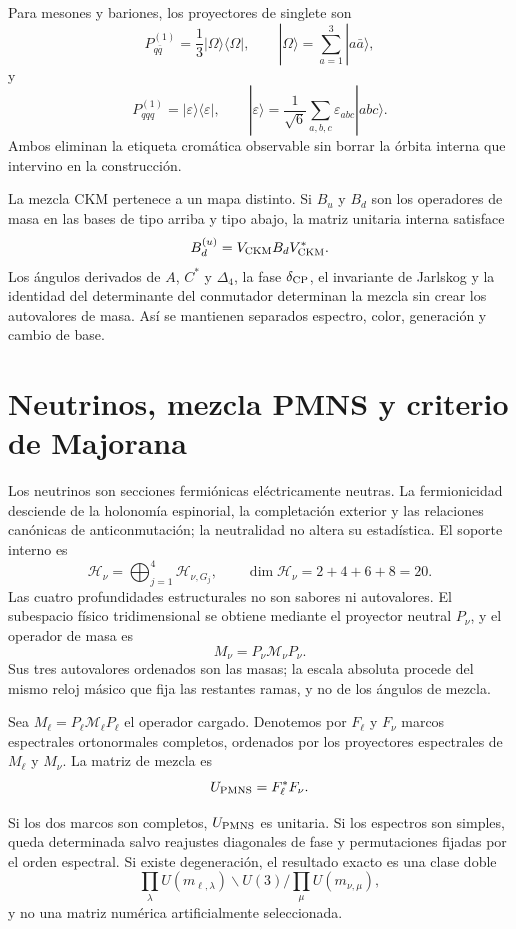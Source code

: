 Para mesones y bariones, los proyectores de singlete son
\[
 P_{q\bar q}^{(1)}
 =\frac1{3}|\Omega\rangle\langle\Omega|,
 \qquad
 |\Omega\rangle=\sum_{a=1}^{3}|a\bar a\rangle,
\]
y
\[
 P_{qqq}^{(1)}
 =|\varepsilon\rangle\langle\varepsilon|,
 \qquad
 |\varepsilon\rangle
 =\frac1{\sqrt6}\sum_{a,b,c}\varepsilon_{abc}|abc\rangle.
\]
Ambos eliminan la etiqueta cromática observable sin borrar la órbita interna
que intervino en la construcción.

La mezcla CKM pertenece a un mapa distinto. Si \(B_u\) y \(B_d\) son los
operadores de masa en las bases de tipo arriba y tipo abajo, la matriz unitaria
interna satisface
\[
 B_d^{(u)}=V_{\rm CKM} B_d V_{\rm CKM}^*.
\]
Los ángulos derivados de \(A\), \(C^*\) y \(\Delta_4\), la fase
\(\delta_{\rm CP}\), el invariante de Jarlskog y la identidad del determinante
del conmutador determinan la mezcla sin crear los autovalores de masa. Así se
mantienen separados espectro, color, generación y cambio de base.

\section{Neutrinos, mezcla PMNS y criterio de Majorana}

Los neutrinos son secciones fermiónicas eléctricamente neutras. La
fermionicidad desciende de la holonomía espinorial, la completación exterior y
las relaciones canónicas de anticonmutación; la neutralidad no altera su
estadística. El soporte interno es
\[
 \mathcal H_\nu=
 \bigoplus_{j=1}^{4}\mathcal H_{\nu,G_j},
 \qquad
 \dim\mathcal H_\nu=2+4+6+8=20.
\]
Las cuatro profundidades estructurales no son sabores ni autovalores. El
subespacio físico tridimensional se obtiene mediante el proyector neutral
\(P_\nu\), y el operador de masa es
\[
 M_\nu=P_\nu\mathcal M_\nu P_\nu.
\]
Sus tres autovalores ordenados son las masas; la escala absoluta procede del
mismo reloj másico que fija las restantes ramas, y no de los ángulos de mezcla.

Sea \(M_\ell=P_\ell\mathcal M_\ell P_\ell\) el operador cargado. Denotemos por
\(F_\ell\) y \(F_\nu\) marcos espectrales ortonormales completos, ordenados por
los proyectores espectrales de \(M_\ell\) y \(M_\nu\). La matriz de mezcla es
\[
 U_{\rm PMNS}=F_\ell^*F_\nu.
\]

\begin{theorem}
Si los dos marcos son completos, \(U_{\rm PMNS}\) es unitaria. Si los
espectros son simples, queda determinada salvo reajustes diagonales de fase y
permutaciones fijadas por el orden espectral. Si existe degeneración, el
resultado exacto es una clase doble
\[
 \prod_\lambda U(m_{\ell,\lambda})
 \backslash U(3) /
 \prod_\mu U(m_{\nu,\mu}),
\]
y no una matriz numérica artificialmente seleccionada.
\end{theorem}

